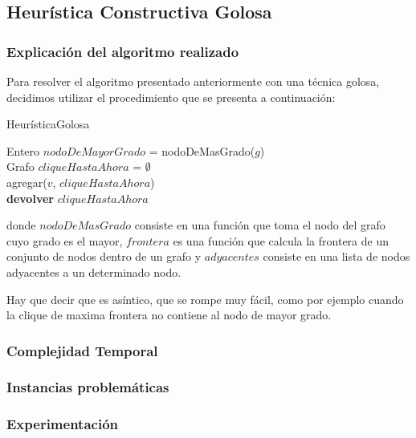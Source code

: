 \subsection{Heurística Constructiva Golosa}

\subsubsection{Explicación del algoritmo realizado}
Para resolver el algoritmo presentado anteriormente con una técnica golosa, decidimos utilizar el procedimiento que se presenta a continuación:\newline
\newline
\begin{algorithm}[H]
    \SetAlgoLined
    \caption{HeurísticaGolosa}
	Entero $nodoDeMayorGrado$ = nodoDeMasGrado($g$)\\
	Grafo $cliqueHastaAhora$ = $\emptyset$\\
	agregar($v$, $cliqueHastaAhora$)\\
\textbf{devolver} $cliqueHastaAhora$
\end{algorithm}

donde $nodoDeMasGrado$ consiste en una función que toma el nodo del grafo cuyo grado es el mayor, $frontera$ es una función que calcula la frontera de un conjunto de nodos dentro de un grafo y $adyacentes$ consiste en una lista de nodos adyacentes a un determinado nodo.\newline


Hay que decir que es asíntico, que se rompe muy fácil, como por ejemplo cuando la clique de maxima frontera no contiene al nodo de mayor grado.
\subsubsection{Complejidad Temporal}
\subsubsection{Instancias problemáticas}
\subsubsection{Experimentación}
